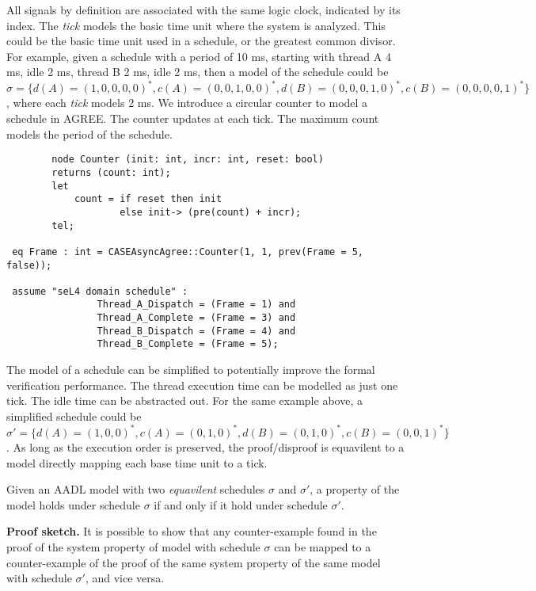 All signals by definition are associated with the same logic clock, indicated by its index. The \emph{tick} models the basic time unit where the system is analyzed. This could be the basic time unit used in a schedule, or the greatest common divisor. For example, given a schedule with a period of 10 ms, starting with thread A 4 ms, idle 2 ms, thread B 2 ms, idle 2 ms, then a model of the schedule could be $\sigma = \{d(A)=(1,0,0,0,0)^*, c(A) = (0,0,1,0,0)^*, d(B) = (0,0,0,1,0)^*, c(B) = (0,0,0,0,1)^*\}$, where each \emph{tick} models 2 ms. We introduce a circular counter to model a schedule in AGREE. The counter updates at each tick. The maximum count models the period of the schedule. 
\begin{verbatim}
		node Counter (init: int, incr: int, reset: bool)	
		returns (count: int);
		let
			count = if reset then init
					else init-> (pre(count) + incr);
		tel;
		
 eq Frame : int = CASEAsyncAgree::Counter(1, 1, prev(Frame = 5, false));

 assume "seL4 domain schedule" :
				Thread_A_Dispatch = (Frame = 1) and
				Thread_A_Complete = (Frame = 3) and					
				Thread_B_Dispatch = (Frame = 4) and	
				Thread_B_Complete = (Frame = 5);	
\end{verbatim}		

The model of a schedule can be simplified to potentially improve the formal verification performance. The thread execution time can be modelled as just one tick. The idle time can be abstracted out. For the same example above, a simplified schedule could be  $\sigma' = \{d(A)=(1,0,0)^*, c(A) = (0,1,0)^*, d(B) = (0,1,0)^*, c(B) = (0,0,1)^*\}$. As long as the execution order is preserved, the proof/disproof is equavilent to a model directly mapping each base time unit to a tick. 
	
\begin{theorem}
Given an AADL model with two \emph{equavilent} schedules $\sigma$ and $\sigma'$, a property of the model holds under schedule $\sigma$ if and only if it hold under schedule $\sigma'$.
\end{theorem}

{\bf Proof sketch.} 
It is possible to show that any counter-example found in the proof of the system property of model with schedule $\sigma$ can be mapped to a counter-example of the proof of the same system property of the same model with schedule $\sigma'$,  and vice versa. 

